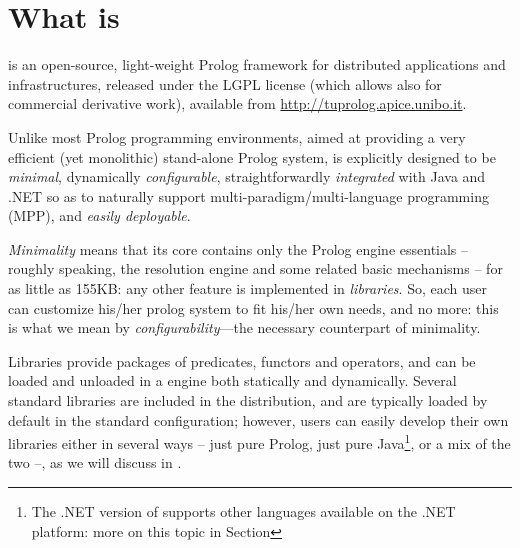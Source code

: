 \chapter{What is \tuprolog{}}
\label{what-is}

\tuprolog{} is an open-source, light-weight Prolog framework for distributed applications and infrastructures, released under the LGPL license (which allows also for commercial derivative work), available from \url{http://tuprolog.apice.unibo.it}.

Unlike most Prolog programming environments, aimed at providing a very efficient (yet monolithic) stand-alone Prolog system, \tuprolog{} is explicitly designed to be \emph{minimal}, dynamically \emph{configurable}, straightforwardly \emph{integrated} with Java and .NET so as to naturally support multi-paradigm/multi-language programming (MPP), and \emph{easily deployable}.

\textit{Minimality} means that its core contains only the Prolog engine essentials -- roughly speaking, the resolution engine and some related basic mechanisms -- for as little as 155KB: any other feature is implemented in \textit{libraries}.
%
So, each user can customize his/her prolog system to fit his/her own needs, and no more:
this is what we mean by \tuprolog{} \textit{configurability}---the necessary counterpart of minimality.

Libraries provide packages of predicates, functors and operators, and can be loaded and unloaded in a \tuprolog{} engine both statically and dynamically.
%
Several standard libraries are included in the \tuprolog{} distribution, and are typically loaded by default in the standard \tuprolog{} configuration; however, users can easily develop their own libraries either in several ways -- just pure Prolog, just pure Java\footnote{The .NET version of \tuprolog{} supports other languages available on the .NET platform: more on this topic in Section }, or a mix of the two --, as we will discuss in .

